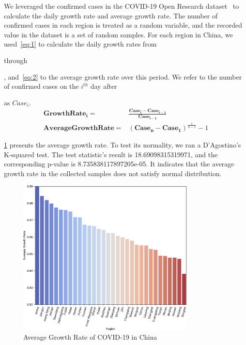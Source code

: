 We leveraged the confirmed cases in the COVID-19 Open Research dataset~\cite{covid19weather} to calculate the daily growth rate and average growth rate. The number of confirmed cases in each region is treated as a random variable, and the recorded value in the dataset is a set of random samples.
For each region in China, we used~\cref{eq:1} to calculate the daily growth rates from \date{2020-01-22} through \date{2020-04-11}, and~\cref{eq:2} to the average growth rate over this period. We refer to the number of confirmed cases on the $i^{th}$ day after \date{2020-01-22} as $Case_i$.
\begin{align}
    \bm{GrowthRate_i} =& \frac{\bm{Case_i} - \bm{Case_{i - 1}}}{\bm{Case_{i - 1}}} \label{eq:1} \\
    \bm{AverageGrowthRate} =& (\bm{Case_n} - \bm{Case_1})^{\frac{1}{n-1}} - 1 \label{eq:2}
\end{align}

\cref{fig:ly1} presents the average growth rate. To test its normality, we ran a D'Agostino's K-squared test. The test statistic's result is 18.69098315319971, and the corresponding p-value is 8.735838117897205e-05. It indicates that the average growth rate in the collected samples does not satisfy normal distribution.
\begin{figure}[htp]
  \centering
  \includegraphics[width=0.8\textwidth]{ly1.pdf}
  \caption{Average Growth Rate of COVID-19 in China}
  \label{fig:ly1}
\end{figure}

